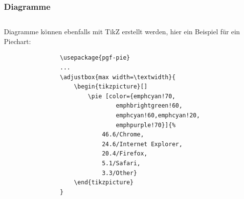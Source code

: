 \documentclass[german,notoc,draft]{tudbeamer}%
\begin{document}
\begin{frame}[fragile]
	\frametitle{Diagramme}

	\begin{columns}[T,onlytextwidth]
		\begin{column}{.475\textwidth}
			Diagramme können ebenfalls mit TikZ erstellt werden, hier ein Beispiel für ein Piechart:
			\begin{lstlisting}[gobble=8,style=latex]
				 % in die Prämbel einfügen
				\usepackage{pgf-pie}
				...
				\adjustbox{max width=\textwidth}{
					\begin{tikzpicture}[]
						\pie [color={emphcyan!70, 
								emphbrightgreen!60,
								emphcyan!60,emphcyan!20,
								emphpurple!70}]{%
							46.6/Chrome,
							24.6/Internet Explorer,
							20.4/Firefox,
							5.1/Safari,
							3.3/Other}
					\end{tikzpicture}
				}
			\end{lstlisting} 
		\end{column}
		\begin{column}{.475\textwidth}
		\end{column}
	\end{columns}
\end{frame}
\end{document}
